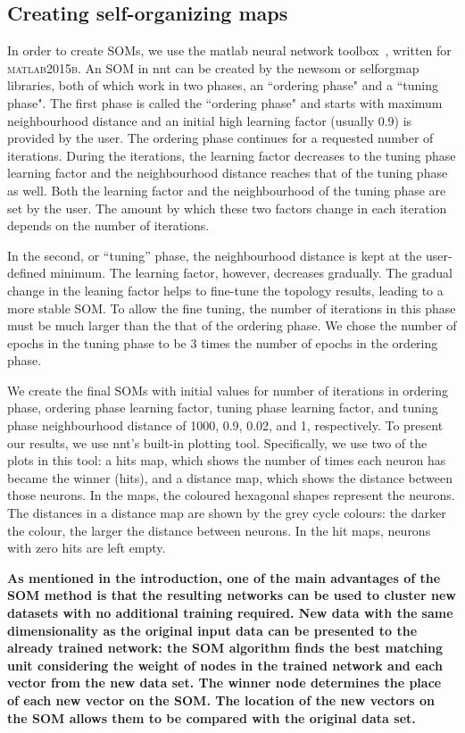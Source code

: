 \subsection{Creating self-organizing maps}
\label{sec: create_som}
     In order to create SOMs, we use the {\sc matlab} neural network toolbox~\citep[NNT,][]{matlabtolbox}, written for \textsc{matlab2015b}. 
     An SOM in {\sc nnt} can be created by the {\sc newsom} or {\sc selforgmap} libraries, both of which work in two phases, an ``ordering phase" and a ``tuning phase". 
     The first phase is called the ``ordering phase" and
     starts with maximum neighbourhood distance and an initial high learning factor (usually 0.9) is provided by the user. 
     The ordering phase continues for a requested number of iterations.
     During the iterations, the learning factor decreases to the tuning phase learning factor and the neighbourhood distance reaches that of the tuning phase as well.
     Both the learning factor and the neighbourhood of the tuning phase are set by the user. 
     The amount by which these two factors change in each iteration depends on the number of iterations.
     
     In the second, or ``tuning'' phase,
     the neighbourhood distance is kept at the user-defined minimum.
     The learning factor, however, decreases gradually.
     The gradual change in the leaning factor helps to fine-tune the topology results, leading to a more stable SOM. 
     To allow the fine tuning, the number of iterations in this phase must be much larger than the that of the ordering phase. 
     We chose the number of epochs in the tuning phase to be 3 times the number of epochs in the ordering phase.
     
     We create the final SOMs with initial values for number of iterations in ordering phase, ordering phase learning factor, tuning phase learning factor, and tuning phase neighbourhood distance of 1000, 0.9, 0.02, and 1, respectively. 
     To present our results, we use {\sc nnt}'s built-in plotting tool.
     Specifically, we use two of the plots in this tool: a hits map, which shows the number of times each neuron has became the winner (hits), and a distance map, which shows the distance between those neurons.
     In the maps, the coloured hexagonal shapes represent the neurons. 
     The distances in a distance map are shown by the grey cycle colours:
     the darker the colour, the larger the distance between neurons.
     In the hit maps, neurons with zero hits are left empty.
     
     \textbf{As mentioned in the introduction, one of the main advantages of the SOM method is that the resulting networks can be used to cluster new datasets with no additional training required.
     New data with the same dimensionality as the original input data can be presented to the already trained network: the SOM algorithm finds the best matching unit considering the weight of nodes in the trained network and each vector from the new data set.
     The winner node determines the place of each new vector on the SOM.
     The location of the new vectors on the SOM allows them to be compared with the original data set. }
     
